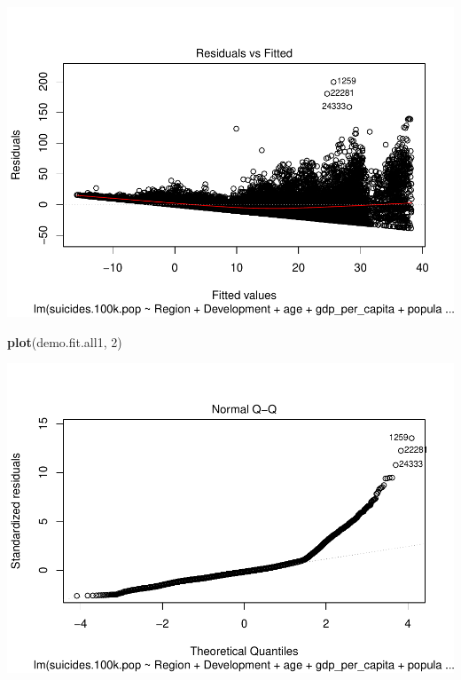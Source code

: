 \documentclass[11pt,]{article}
\newenvironment{Shaded}{\begin{snugshade}}{\end{snugshade}}
\newcommand{\DecValTok}[1]{\textcolor[rgb]{0.00,0.00,0.81}{#1}}
\newcommand{\KeywordTok}[1]{\textcolor[rgb]{0.13,0.29,0.53}{\textbf{#1}}}
\newcommand{\NormalTok}[1]{#1}
\begin{document}
\includegraphics{An-Analysis-of-Suicide-Data_files/figure-latex/unnamed-chunk-2-1.pdf}

\begin{Shaded}
\begin{Highlighting}[]
\KeywordTok{plot}\NormalTok{(demo.fit.all1, }\DecValTok{2}\NormalTok{)}
\end{Highlighting}
\end{Shaded}

\includegraphics{An-Analysis-of-Suicide-Data_files/figure-latex/unnamed-chunk-2-2.pdf}
\end{document}
